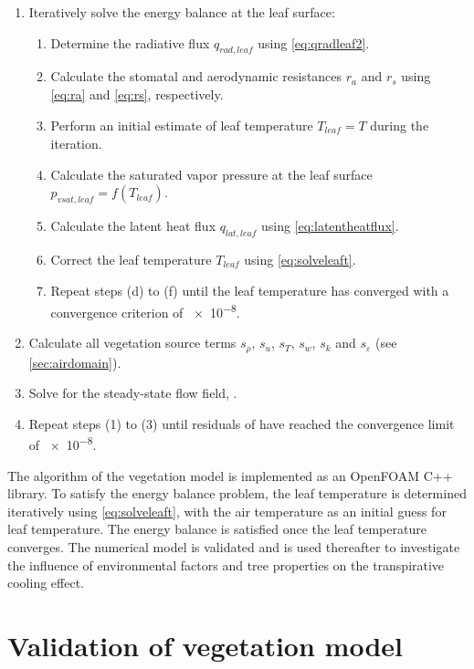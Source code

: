 \begin{enumerate}
\item Iteratively solve the energy balance at the leaf surface:
\begin{enumerate}
	\item Determine the radiative flux $q_{\mathit{rad,leaf}}$ using \cref{eq:qradleaf2}.
	\item Calculate the stomatal and aerodynamic resistances $r_a$ and $r_s$ using \cref{eq:ra} and \cref{eq:rs}, respectively.
	\item Perform an initial estimate of leaf temperature $T_{\mathit{leaf}}=T$ during the iteration.
	\item Calculate the saturated vapor pressure at the leaf surface $p_{\mathit{vsat,leaf}}=f(T_{\mathit{leaf}})$.
	\item Calculate the latent heat flux $q_{\mathit{lat,leaf}}$ using \cref{eq:latentheatflux}. 
	\item Correct the leaf temperature $T_{\mathit{leaf}}$ using \cref{eq:solveleaft}.
	\item Repeat steps (d) to (f) until the leaf temperature has converged with a convergence criterion of \num{e-8}.
\end{enumerate}
\item Calculate all vegetation source terms $s_\rho$, $s_u$, $s_T$, $s_w$, $s_k$ and $s_{\varepsilon}$ (see \cref{sec:airdomain}).
\item Solve for the steady-state flow field, .
\item Repeat steps (1) to (3) until residuals of  have reached the convergence limit of \num{e-8}.
\end{enumerate}

The algorithm of the vegetation model is implemented as an OpenFOAM C++ library. To satisfy the energy balance problem, the leaf temperature is determined iteratively using \cref{eq:solveleaft}, with the air temperature as an initial guess for leaf temperature. The energy balance is satisfied once the leaf temperature converges. The numerical model is validated and is used thereafter to investigate the influence of environmental factors and tree properties on the transpirative cooling effect.

\section{Validation of vegetation model}

